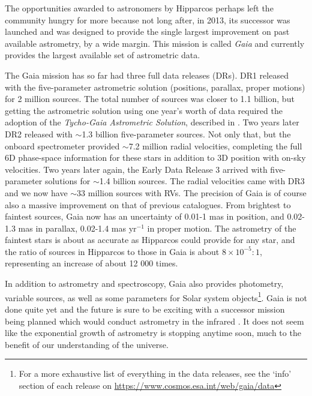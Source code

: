 The opportunities awarded to astronomers by Hipparcos perhaps left the community hungry for more because not long after, in 2013, its successor was launched and was designed to provide the single largest improvement on past available astrometry, by a wide margin. This mission is called \textit{Gaia} \citep{gaia} and currently provides the largest available set of astrometric data. 

The Gaia mission has so far had three full data releases (DRs). DR1 \citep{dr1} released with the five-parameter astrometric solution (positions, parallax, proper motions) for 2 million sources. The total number of sources was closer to 1.1 billion, but getting the astrometric solution using one year's worth of data required the adoption of the \textit{Tycho-Gaia Astrometric Solution}, described in \cite{michalik:15}. Two years later DR2 \citep{dr2} released with {$\sim$}1.3 billion five-parameter sources. Not only that, but the onboard spectrometer provided {$\sim$}7.2 million radial velocities, completing the full 6D phase-space information for these stars in addition to 3D position with on-sky velocities. Two years later again, the Early Data Release 3 \citep{edr3} arrived with five-parameter solutions for {$\sim$}1.4 billion sources. The radial velocities came with DR3 \citep{dr3} and we now have {$\sim$}33 million sources with RVs. The precision of Gaia is of course also a massive improvement on that of previous catalogues. From brightest to faintest sources, Gaia now has an uncertainty of 0.01-1 mas in position, and 0.02-1.3 mas in parallax, 0.02-1.4 mas yr$^{-1}$ in proper motion. The astrometry of the faintest stars is about as accurate as Hipparcos could provide for any star, and the ratio of sources in Hipparcos to those in Gaia is about $8\times 10^{-5}:1$, representing an increase of about 12 000 times. 

In addition to astrometry and spectroscopy, Gaia also provides photometry, variable sources, as well as some parameters for Solar system objects\footnote{For a more exhaustive list of everything in the data releases, see the `info' section of each release on \url{https://www.cosmos.esa.int/web/gaia/data}}. Gaia is not done quite yet and the future is sure to be exciting with a successor mission being planned which would conduct astrometry in the infrared \citep{hobbs:21}. It does not seem like the exponential growth of astrometry is stopping anytime soon, much to the benefit of our understanding of the universe.

